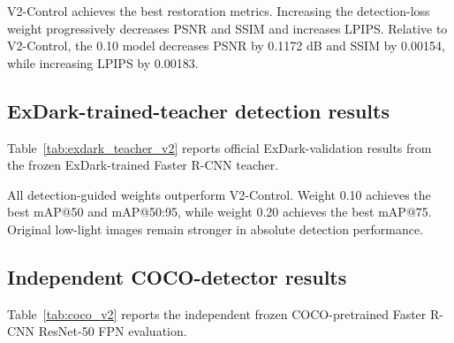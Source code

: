 V2-Control achieves the best restoration metrics. Increasing the
detection-loss weight progressively decreases PSNR and SSIM and increases
LPIPS. Relative to V2-Control, the 0.10 model decreases PSNR by 0.1172 dB
and SSIM by 0.00154, while increasing LPIPS by 0.00183.

\subsection{ExDark-trained-teacher detection results}

Table~\ref{tab:exdark_teacher_v2} reports official ExDark-validation
results from the frozen ExDark-trained Faster R-CNN teacher.

\begin{table}[t]
\centering
\caption{ExDark official-validation results using the ExDark-trained guidance teacher.}
\label{tab:exdark_teacher_v2}
\end{table}

All detection-guided weights outperform V2-Control. Weight 0.10 achieves
the best mAP@50 and mAP@50:95, while weight 0.20 achieves the best mAP@75.
Original low-light images remain stronger in absolute detection
performance.

\subsection{Independent COCO-detector results}

Table~\ref{tab:coco_v2} reports the independent frozen
COCO-pretrained Faster R-CNN ResNet-50 FPN evaluation.

